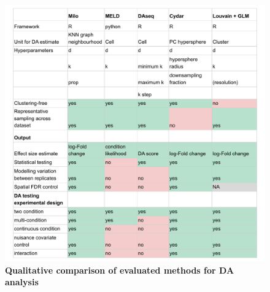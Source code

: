 \documentclass[
]{article}
\begin{document}
\begin{figure}
\centering
\includegraphics{suppl_tables/table_methods_comparison.pdf}
\caption{\label{fig:sup-tab-1}\textbf{Qualitative comparison of evaluated methods for DA analysis}}
\end{figure}



\newpage
\end{document}
